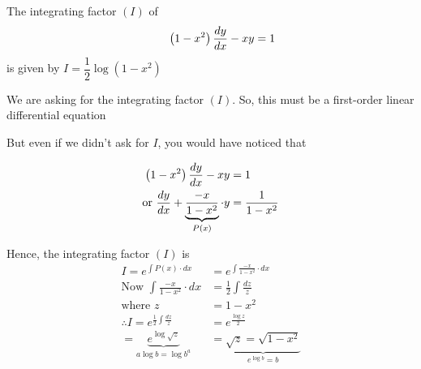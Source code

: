 \documentclass[14pt,fleqn]{extarticle}
\begin{document}
 
\begin{snippet}
    
    \incorrect
    
    The integrating factor $(I)$ of 
    \[ \qquad \left(1-x^2 \right)\frac{dy}{dx} - xy = 1 \]
    is given by $I = \dfrac{1}{2}\log \left(1-x^2 \right)$ 
    
    \reason
    
    We are asking for the integrating factor $(I)$. So, this must be a first-order 
    linear differential equation \newline 
    
    But even if we didn't ask for $I$, you would have noticed that 
    
    \begin{align}
	\left(1-x^2 \right)\frac{dy}{dx} - xy &= 1 \\
	\text{or } \frac{dy}{dx} + \underbrace{\frac{-x}{1-x^2}}_{P(x)}\cdot y &= \frac{1}{1-x^2}
\end{align}

Hence, the integrating factor $(I)$ is 
\begin{align}
	I = e^{\int P(x)\cdot dx} &= e^{\int \frac{-x}{1-x^2}\cdot dx }\\
	\text{Now }\int \frac{-x}{1-x^2}\cdot dx &= \frac{1}{2}\int \frac{dz}{z} \\
	\text{where } z &= 1-x^2 \\
	\therefore I = e^{\frac{1}{2}\int \frac{dz}{z}} &= e^{\frac{\log z}{2}} \\
	= \underbrace{e^{\log \sqrt{z}}}_{a\log b = \log b^a} &= \underbrace{\sqrt{z} = \sqrt{1-x^2}}_{e^{\log b} = b} 
\end{align}
\end{snippet} 
\end{document}
